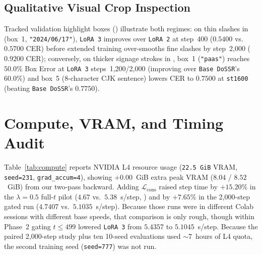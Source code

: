 \documentclass[11pt]{article}
\begin{document}
\subsection{Qualitative Visual Crop Inspection}
Tracked validation highlight boxes () illustrate both regimes: on thin slashes in  (box~1, \texttt{"2024/06/17"}), \texttt{LoRA~3} improves over \texttt{LoRA~2} at step~400 ($0.5400$ vs.\ $0.5700$ CER) before extended training over-smooths fine slashes by step~2,000 ($0.9200$ CER); conversely, on thicker signage strokes in , box~1 (\texttt{"paas"}) reaches $50.0\%$ Box Error at \texttt{LoRA~3} steps~1,200/2,000 (improving over \texttt{Base DoSSR}'s $60.0\%$) and box~5 (8-character CJK sentence) lowers CER to $0.7500$ at \texttt{st1600} (beating \texttt{Base DoSSR}'s $0.7750$).

\section{Compute, VRAM, and Timing Audit}
Table~\ref{tab:compute} reports NVIDIA L4 resource usage (\texttt{22.5~GiB} VRAM, \texttt{seed=231}, \texttt{grad\_accum=4}), showing $+0.00$~GiB extra peak VRAM ($8.04$ / $8.52$~GiB) from our two-pass backward. Adding $\mathcal{L}_{\text{cons}}$ raised step time by $+15.20\%$ in the $\lambda=0.5$ full-$t$ pilot ($4.67$ vs.\ $5.38$~s/step, ) and by $+7.65\%$ in the 2,000-step gated run ($4.7407$ vs.\ $5.1035$~s/step). Because those runs were in different Colab sessions with different base speeds, that comparison is only rough, though within Phase~2 gating $t \le 499$ lowered \texttt{LoRA~3} from $5.4357$ to $5.1045$~s/step. Because the paired 2,000-step study plus ten 10-seed evaluations used $\sim 7$~hours of L4 quota, the second training seed (\texttt{seed=777}) was not run.

\begin{table}[ht]
\centering
\small
\caption{Phase-2 NVIDIA L4 hardware, timestep gating, and wall-time audit (\texttt{seed=231}, \texttt{grad\_accum=4}).}
\label{tab:compute}
\end{table}
\end{document}
